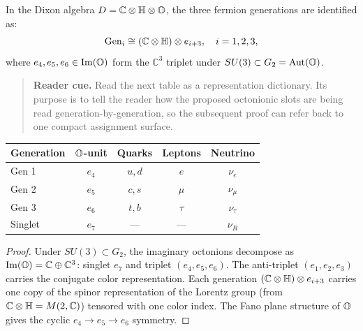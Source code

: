 \begin{theorem}
\label{thm:three-generations}
In the Dixon algebra $D=\mathbb{C}\otimes\mathbb{H}\otimes\mathbb{O}$, the three
fermion generations are identified as:
\[
 \mathrm{Gen}_i \cong (\mathbb{C}\otimes\mathbb{H})\otimes e_{i+3},
 \quad i=1,2,3,
\]
where $e_4,e_5,e_6\in\mathrm{Im}(\mathbb{O})$ form the $\mathbb{C}^3$ triplet
under $SU(3)\subset G_2=\mathrm{Aut}(\mathbb{O})$.
\begin{quote}\small
\noindent\textbf{Reader cue.} Read the next table as a representation dictionary. Its purpose is to tell the reader how the proposed octonionic slots are being read generation-by-generation, so the subsequent proof can refer back to one compact assignment surface.
\end{quote}
\begin{center}
\renewcommand{\arraystretch}{1.2}
{\small\setlength{\tabcolsep}{4pt}\begin{tabular}{@{}p{}cccc@{}}
\toprule
Generation & $\mathbb{O}$-unit & Quarks & Leptons & Neutrino\\
\midrule
Gen 1 & $e_4$ & $u,d$ & $e$ & $\nu_e$\\
Gen 2 & $e_5$ & $c,s$ & $\mu$ & $\nu_\mu$\\
Gen 3 & $e_6$ & $t,b$ & $\tau$ & $\nu_\tau$\\
Singlet & $e_7$ & --- & --- & $\nu_R$\\
\bottomrule
\end{tabular}}
\end{center}
\end{theorem}

\begin{proof}
Under $SU(3)\subset G_2$, the imaginary octonions decompose as
$\mathrm{Im}(\mathbb{O})=\mathbb{C}\oplus\mathbb{C}^3$: singlet $e_7$ and
triplet $(e_4,e_5,e_6)$.
The anti-triplet $(e_1,e_2,e_3)$ carries the conjugate color
representation.
Each generation $(\mathbb{C}\otimes\mathbb{H})\otimes e_{i+3}$ carries one
copy of the spinor representation of the Lorentz group (from
$\mathbb{C}\otimes\mathbb{H}=M(2,\mathbb{C})$) tensored with one color index.
The Fano plane structure of $\mathbb{O}$ gives the cyclic $e_4\to e_5\to e_6$
symmetry.
\end{proof}

